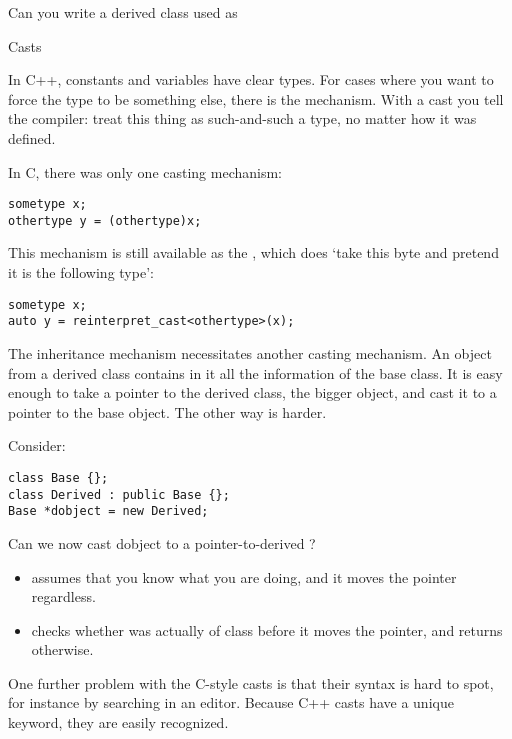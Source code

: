 \begin{exercise}
  \label{ex:morenewtonlambda}
  Can you write a derived class  used as
\end{exercise}

 {Casts}
\label{sec:cast}

In C++, constants and variables have clear types. For cases where you
want to force the type to be something else, there is the
 mechanism. With a cast you tell the compiler:
treat this thing as such-and-such a type, no matter how it was
defined.

In C, there was only one casting mechanism:
\begin{verbatim}
sometype x;
othertype y = (othertype)x;
\end{verbatim}
This mechanism is still available as the
, which does `take this byte and pretend
it is the following type':
\begin{verbatim}
sometype x;
auto y = reinterpret_cast<othertype>(x);
\end{verbatim}

The inheritance mechanism necessitates another casting mechanism.
An object from a derived class contains in it all the information of
the base class. It is easy enough to take a pointer to the derived
class, the bigger object, and cast it to a pointer to the base object.
The other way is harder.

Consider:
\begin{verbatim}
class Base {};
class Derived : public Base {};
Base *dobject = new Derived;
\end{verbatim}
Can we now cast dobject to a pointer-to-derived ?
\begin{itemize}
\item {} assumes that you know what you are
  doing, and it moves the pointer regardless.
\item {} checks whether  was
  actually of class  before it moves the pointer, and
  returns  otherwise.
\end{itemize}

\begin{remark}
  One further problem with the C-style casts is that their syntax is
  hard to spot, for instance by searching in an editor.
  Because C++ casts have a unique keyword, they are easily recognized.
\end{remark}

